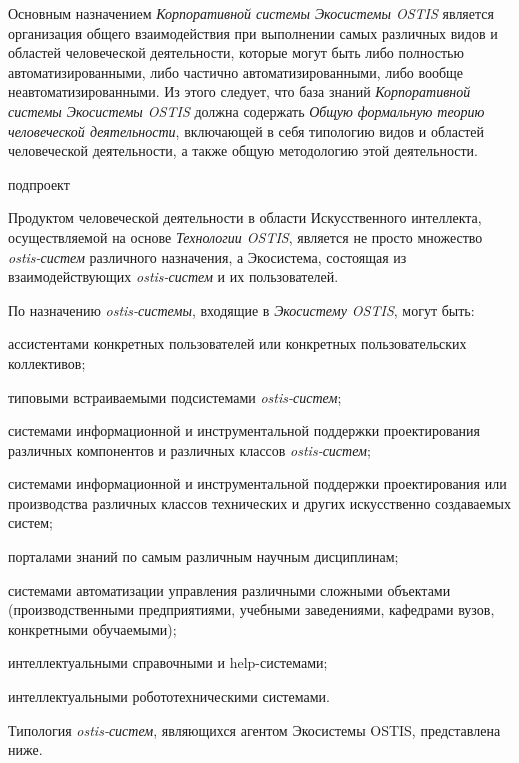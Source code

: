 Основным назначением \textit{Корпоративной системы Экосистемы OSTIS} является организация общего взаимодействия при выполнении самых различных видов и областей человеческой деятельности, которые могут быть либо полностью автоматизированными, либо частично автоматизированными, либо вообще неавтоматизированными. 
Из этого следует, что база знаний \textit{Корпоративной системы Экосистемы OSTIS} должна содержать \textit{Общую формальную теорию человеческой деятельности}, включающей в себя типологию видов и областей человеческой деятельности, а также общую методологию этой деятельности.

\begin{SCn}
\begin{scnrelfromlist}{подпроект}
\end{scnrelfromlist}
\end{SCn}

Продуктом человеческой деятельности в области Искусственного интеллекта, осуществляемой на основе \textit{Технологии OSTIS}, является не просто множество \textit{ostis-систем} различного назначения, а Экосистема, состоящая из взаимодействующих \textit{ostis-систем} и их пользователей. 

По назначению \textit{ostis-системы}, входящие в \textit{Экосистему OSTIS}, могут быть:
\begin{textitemize}
    \item ассистентами конкретных пользователей или конкретных пользовательских коллективов;
    \item типовыми встраиваемыми подсистемами \textit{ostis-систем};
    \item системами информационной и инструментальной поддержки проектирования различных компонентов и различных классов \textit{ostis-систем};
    \item системами информационной и инструментальной поддержки проектирования или производства различных классов технических и других искусственно создаваемых систем;
    \item порталами знаний по самым различным научным дисциплинам;
    \item системами автоматизации управления различными сложными объектами (производственными предприятиями, учебными заведениями, кафедрами вузов, конкретными обучаемыми);
    \item интеллектуальными справочными и help-системами;
    \item интеллектуальными робототехническими системами.
\end{textitemize}
Типология \textit{ostis-систем}, являющихся агентом Экосистемы OSTIS, представлена ниже.

